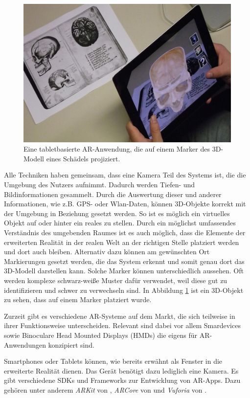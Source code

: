 \begin{figure}[!htb]
	\centering
	\includegraphics[width=0.5\linewidth]{images/App_iSkull,_an_augmented_human_skull.jpg}
	\caption{Eine tabletbasierte AR-Anwendung, die auf einem Marker des 3D-Modell  eines Schädels projiziert.}
	\label{img:ARMarker}
\end{figure}
\FloatBarrier

Alle Techniken haben gemeinsam, dass eine Kamera Teil des Systems ist, die die Umgebung des Nutzers aufnimmt. Dadurch werden Tiefen- und Bildinformationen gesammelt. Durch die Auswertung dieser und anderer Informationen, wie z.B. GPS- oder Wlan-Daten, können 3D-Objekte korrekt mit der Umgebung in Beziehung gesetzt werden. So ist es möglich ein virtuelles Objekt auf oder hinter ein reales zu stellen. Durch ein möglichst umfassendes Verständnis des umgebenden Raumes ist es auch möglich, dass die Elemente der erweiterten Realität in der realen Welt an der richtigen Stelle platziert werden und dort auch bleiben.
Alternativ dazu können am gewünschten Ort Markierungen gesetzt werden, die das System erkennt und somit genau dort das 3D-Modell darstellen kann. Solche Marker können unterschiedlich aussehen. Oft werden komplexe schwarz-weiße Muster dafür verwendet, weil diese gut zu identifizieren und schwer zu verwechseln sind. In Abbildung \ref{img:ARMarker} ist ein 3D-Objekt zu sehen, dass auf einem Marker platziert wurde. 

Zurzeit gibt es verschiedene AR-Systeme auf dem Markt, die sich teilweise in ihrer Funktionsweise unterscheiden. Relevant sind dabei vor allem Smardevices sowie Binoculare Head Mounted Displays (HMDs) die eigens für AR-Anwendungen konzipiert sind.

Smartphones oder Tablets können, wie bereits erwähnt  als Fenster in die erweiterte Realität dienen. Das Gerät benötigt dazu lediglich eine Kamera. Es gibt verschiedene SDKs und Frameworks zur Entwicklung von AR-Apps. Dazu gehören unter anderem \textit{ARKit} von \cite{arKit}, \textit{ARCore} von \cite{ARCore} und \textit{Vuforia} von \cite{vuforia}.

